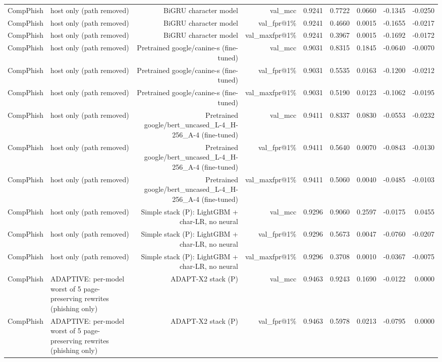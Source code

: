 \begin{table}[t]
\begin{tabular}{llrrrrrrr}
CompPhish & host only (path removed) & BiGRU character model & val\_mcc & 0.9241 & 0.7722 & 0.0660 & -0.1345 & -0.0250 \\
CompPhish & host only (path removed) & BiGRU character model & val\_fpr@1\% & 0.9241 & 0.4660 & 0.0015 & -0.1655 & -0.0217 \\
CompPhish & host only (path removed) & BiGRU character model & val\_maxfpr@1\% & 0.9241 & 0.3967 & 0.0015 & -0.1692 & -0.0172 \\
CompPhish & host only (path removed) & Pretrained google/canine-s (fine-tuned) & val\_mcc & 0.9031 & 0.8315 & 0.1845 & -0.0640 & -0.0070 \\
CompPhish & host only (path removed) & Pretrained google/canine-s (fine-tuned) & val\_fpr@1\% & 0.9031 & 0.5535 & 0.0163 & -0.1200 & -0.0212 \\
CompPhish & host only (path removed) & Pretrained google/canine-s (fine-tuned) & val\_maxfpr@1\% & 0.9031 & 0.5190 & 0.0123 & -0.1062 & -0.0195 \\
CompPhish & host only (path removed) & Pretrained google/bert\_uncased\_L-4\_H-256\_A-4 (fine-tuned) & val\_mcc & 0.9411 & 0.8337 & 0.0830 & -0.0553 & -0.0232 \\
CompPhish & host only (path removed) & Pretrained google/bert\_uncased\_L-4\_H-256\_A-4 (fine-tuned) & val\_fpr@1\% & 0.9411 & 0.5640 & 0.0070 & -0.0843 & -0.0130 \\
CompPhish & host only (path removed) & Pretrained google/bert\_uncased\_L-4\_H-256\_A-4 (fine-tuned) & val\_maxfpr@1\% & 0.9411 & 0.5060 & 0.0040 & -0.0485 & -0.0103 \\
CompPhish & host only (path removed) & Simple stack (P): LightGBM + char-LR, no neural & val\_mcc & 0.9296 & 0.9060 & 0.2597 & -0.0175 & 0.0455 \\
CompPhish & host only (path removed) & Simple stack (P): LightGBM + char-LR, no neural & val\_fpr@1\% & 0.9296 & 0.5673 & 0.0047 & -0.0760 & -0.0207 \\
CompPhish & host only (path removed) & Simple stack (P): LightGBM + char-LR, no neural & val\_maxfpr@1\% & 0.9296 & 0.3708 & 0.0010 & -0.0367 & -0.0075 \\
CompPhish & ADAPTIVE: per-model worst of 5 page-preserving rewrites (phishing only) & ADAPT-X2 stack (P) & val\_mcc & 0.9463 & 0.9243 & 0.1690 & -0.0122 & 0.0000 \\
CompPhish & ADAPTIVE: per-model worst of 5 page-preserving rewrites (phishing only) & ADAPT-X2 stack (P) & val\_fpr@1\% & 0.9463 & 0.5978 & 0.0213 & -0.0795 & 0.0000 \\

\end{tabular}
\end{table}
